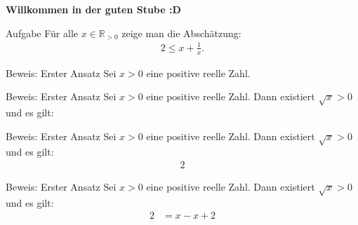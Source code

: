 \documentclass[10pt]{beamer}
\title{}
\author{Artur's Mathematikstübchen}
\date{}
\def\bR{\mathbb{R}}
\begin{document}

\begin{frame}
    \begin{center}
        \textbf{\huge Willkommen in der guten Stube \newline \newline :D}
    \end{center}
\end{frame}




\begin{frame}
    \begin{alertblock}{Aufgabe}
        Für alle \( x \in \bR_{> 0} \) zeige man die Abschätzung:
        \begin{align*}
            2
            \leq x + \frac{1}{x}.
        \end{align*}
    \end{alertblock}
\end{frame}



\begin{frame}{Beweis: Erster Ansatz}
    Sei \( x > 0 \) eine positive reelle Zahl.
\end{frame}



\begin{frame}{Beweis: Erster Ansatz}
    Sei \( x > 0 \) eine positive reelle Zahl. Dann existiert \( \sqrt{x} > 0 \) und es gilt:
\end{frame}



\begin{frame}{Beweis: Erster Ansatz}
    Sei \( x > 0 \) eine positive reelle Zahl. Dann existiert \( \sqrt{x} > 0 \) und es gilt:
    \begin{align*}
        2
    \end{align*}
\end{frame}




\begin{frame}{Beweis: Erster Ansatz}
    Sei \( x > 0 \) eine positive reelle Zahl. Dann existiert \( \sqrt{x} > 0 \) und es gilt:
    \begin{align*}
        2
        & = x - x + 2
    \end{align*}
\end{frame}
\end{document}

